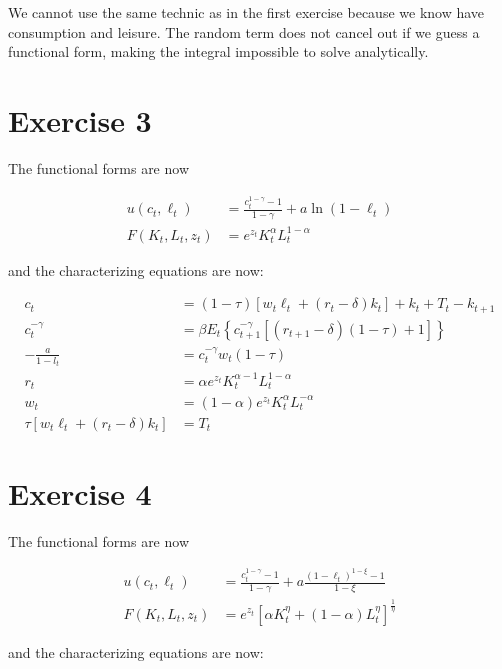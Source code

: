 \documentclass[11pt]{article}
\numberwithin{equation}{section}
\theoremstyle{plain}
\theoremstyle{definition}
\newcommand{\1}{\mathbbm 1}
\def\a{\alpha}
\def\g{\gamma}
\begin{document}
We cannot use the same technic as in the first exercise because we know have consumption and leisure. The random term does not cancel out if we guess a functional form, making the integral impossible to solve analytically. 


\section{Exercise 3}
The functional forms are now 

\begin{align} 
u\left(c_{t}, \ell_{t}\right) &=\frac{c_{t}^{1-\gamma}-1}{1-\gamma}+a \ln \left(1-\ell_{t}\right) \\ 
F\left(K_{t}, L_{t}, z_{t}\right) &=e^{z_{t}} K_{t}^{\alpha} L_{t}^{1-\alpha} \end{align}

and the characterizing equations are now:

\begin{align}
c_{t}&=(1-\tau)\left[w_{t} \ell_{t}+\left(r_{t}-\delta\right) k_{t}\right]+k_{t}+T_{t}-k_{t+1} \\
c_t^{-\g}&=\beta E_{t}\left\{c_{t+1}^{-\g}\left[\left(r_{t+1}-\delta\right)(1-\tau)+1\right]\right\} \\
-\frac{a}{1-l_t}&=c_t^{-\g} w_{t}(1-\tau) \\
r_{t}&=\a e^{z_{t}} K_{t}^{\alpha-1} L_{t}^{1-\alpha} \\
w_{t}&=(1 - \a) e^{z_{t}} K_{t}^{\alpha} L_{t}^{-\alpha} \\
\tau\left[w_{t} \ell_{t}+\left(r_{t}-\delta\right) k_{t}\right]&=T_{t}
\end{align}

\section{Exercise 4}
The functional forms are now 

\begin{align} 
 u\left(c_{t}, \ell_{t}\right) &=\frac{c_{t}^{1-\gamma}-1}{1-\gamma}+a \frac{\left(1-\ell_{t}\right)^{1-\xi}-1}{1-\xi} \\ F\left(K_{t}, L_{t}, z_{t}\right) &=e^{z_{t}}\left[\alpha K_{t}^{\eta}+(1-\alpha) L_{t}^{\eta}\right]^{\frac{1}{\eta}} 
 \end{align}

and the characterizing equations are now:
\end{document}
